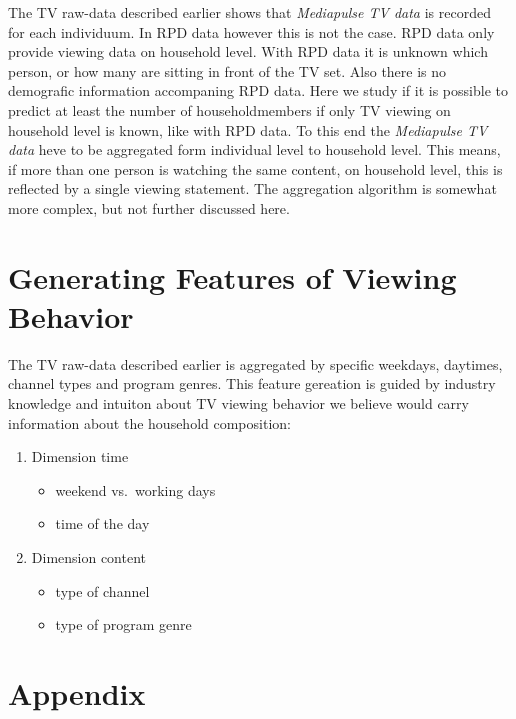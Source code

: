 \documentclass[]{article}
\providecommand{\tightlist}{%
  \setlength{\itemsep}{0pt}\setlength{\parskip}{0pt}}
\begin{document}
The TV raw-data described earlier shows that \emph{Mediapulse TV data}
is recorded for each individuum. In RPD data however this is not the
case. RPD data only provide viewing data on household level. With RPD
data it is unknown which person, or how many are sitting in front of the
TV set. Also there is no demografic information accompaning RPD data.
Here we study if it is possible to predict at least the number of
householdmembers if only TV viewing on household level is known, like
with RPD data. To this end the \emph{Mediapulse TV data} heve to be
aggregated form individual level to household level. This means, if more
than one person is watching the same content, on household level, this
is reflected by a single viewing statement. The aggregation algorithm is
somewhat more complex, but not further discussed here.

\section{Generating Features of Viewing
Behavior}\label{generating-features-of-viewing-behavior}

The TV raw-data described earlier is aggregated by specific weekdays,
daytimes, channel types and program genres. This feature gereation is
guided by industry knowledge and intuiton about TV viewing behavior we
believe would carry information about the household composition:

\begin{enumerate}
\def\labelenumi{\arabic{enumi}.}
\tightlist
\item
  Dimension time

  \begin{itemize}
  \tightlist
  \item
    weekend vs.~working days
  \item
    time of the day
  \end{itemize}
\item
  Dimension content

  \begin{itemize}
  \tightlist
  \item
    type of channel
  \item
    type of program genre
  \end{itemize}
\end{enumerate}

\section{Appendix}\label{appendix}
\end{document}
